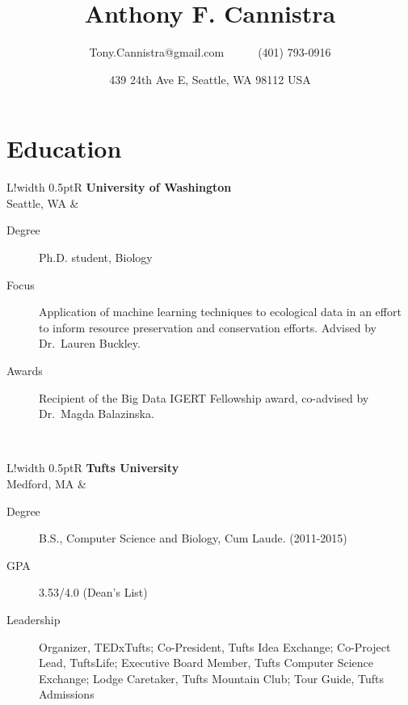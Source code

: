 \documentclass[10pt, letter]{article}
\title{\vspace{-80pt}\bfseries Anthony F. Cannistra\vspace{-10pt}}
\author{Tony.Cannistra@gmail.com~~~~~~(401) 793-0916}
\date{\vspace{-6pt}\small{
439 24th Ave E, Seattle, WA 98112 USA
\vspace{-20pt}
}
}
\newcommand\VRule{\color{lightgray}\vrule width 0.5pt}
\begin{document}
\maketitle
\thispagestyle{empty}

\section*{Education}

\begin{tabular}{L!{\VRule}R}
\textbf{University of Washington} \\ Seattle, WA &
\vspace{-16.7pt}
\begin{description}
\item [Degree] Ph.D. student, Biology 
\item [Focus] Application of machine learning techniques to ecological data in an effort to inform resource preservation and conservation efforts. Advised by Dr.~Lauren Buckley.
\item [Awards] {Recipient of the Big Data IGERT Fellowship award, co-advised by Dr.~Magda \newline Balazinska}. 
\end{description} \\

\end{tabular}
\begin{tabular}{L!{\VRule}R}
\textbf{Tufts University} \\ Medford, MA &
\vspace{-16.7pt}
\begin{description}
\item[Degree] B.S., Computer Science and Biology, Cum Laude. (2011-2015)
\item[GPA] 3.53/4.0 (Dean's List)
\item[Leadership] Organizer, TEDxTufts; Co-President, Tufts Idea Exchange; Co-Project Lead, TuftsLife; Executive Board Member, Tufts Computer Science Exchange; Lodge Caretaker, Tufts Mountain Club; Tour Guide, Tufts Admissions
\end{description} \\


\end{tabular}
\end{document}
